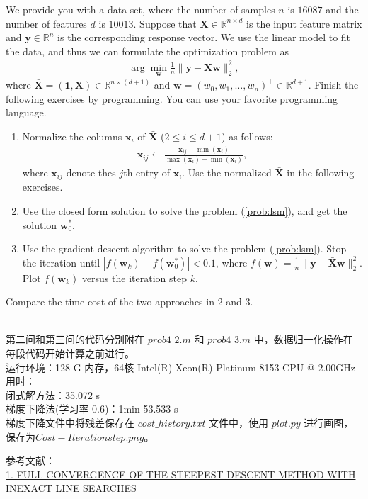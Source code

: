 \documentclass[11pt,letter,notitlepage]{article}
\begin{document}
\begin{exercise}
    We provide you with a data set, where the number of samples $n$ is $16087$ and the number of features $d$ is $10013$. Suppose that $\textbf{X}\in\mathbb{R}^{n\times d}$ is the input feature matrix and $\textbf{y}\in\mathbb{R}^n$ is the corresponding response vector. We use the linear model to fit the data, and thus we can formulate the optimization problem as 
    \begin{align}\label{prob:lsm}
        \arg\min_{\textbf{w}} \frac{1}{n}\|\textbf{y}-\bar{\textbf{X}}\textbf{w}\|_2^2,
    \end{align}
    where $\bar{\textbf{X}}=(\textbf{1},\textbf{X})\in\mathbb{R}^{n\times(d+1)}$ and $\textbf{w}=(w_0,w_1,\dots,w_n)^\top\in\mathbb{R}^{d+1}$.
    Finish the following exercises by programming. You can use your favorite programming language.
    \begin{enumerate}
        \item Normalize the columns $\textbf{x}_i$ of $\bar{\textbf{X}}$ ($2\le i\le d+1$) as follows:
        \begin{align*}
            \textbf{x}_{ij}\leftarrow\frac{\textbf{x}_{ij}-\min (\textbf{x}_i)}{\max (\textbf{x}_i)-\min (\textbf{x}_i)},
        \end{align*}
        where $\textbf{x}_{ij}$ denote thes $j$th entry of $\textbf{x}_i$. Use the normalized $\bar{\textbf{X}}$ in the following exercises.
        \item Use the closed form solution to solve the problem (\ref{prob:lsm}), and get the solution $\textbf{w}_0^*$.
        \item Use the gradient descent algorithm to solve the problem (\ref{prob:lsm}). Stop the iteration until $|f(\textbf{w}_k)-f(\textbf{w}_0^*)|<0.1$, where $f(\textbf{w}) = \frac{1}{n}\|\textbf{y}-\bar{\textbf{X}}\textbf{w} \|_2^2$. Plot $f(\textbf{w}_k)$ versus the iteration step $k$. 
    \end{enumerate}
    Compare the time cost of the two approaches in 2 and 3.
    
\end{exercise}
\begin{solution}
    \heiti
    \ \\
    第二问和第三问的代码分别附在 $prob4\_2.m$ 和 $prob4\_3.m$ 中，数据归一化操作在每段代码开始计算之前进行。\\
    运行环境：128 G 内存，64核 Intel(R) Xeon(R) Platinum 8153 CPU @ 2.00GHz\\
    用时：\\闭式解方法：35.072 s \\
    梯度下降法(学习率 0.6)：1min 53.533 s\\ 
    梯度下降文件中将残差保存在 $cost\_history.txt$ 文件中，使用 $plot.py$ 进行画图，保存为$Cost-Iteration step.png$。
\end{solution}

\heiti
参考文献：\\
\href{http://w3.impa.br/~benar/docs/fcsd.pdf}{1. FULL CONVERGENCE OF THE STEEPEST DESCENT METHOD WITH INEXACT LINE SEARCHES}

\end{document}
